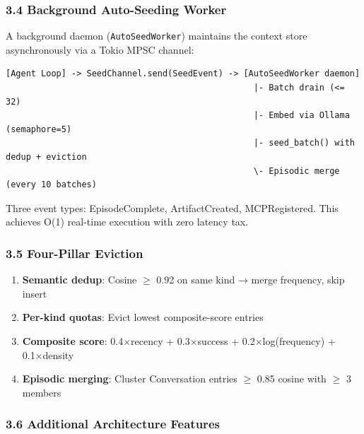 \documentclass[
  10pt,
]{article}
\providecommand{\tightlist}{%
  \setlength{\itemsep}{0pt}\setlength{\parskip}{0pt}}
\begin{document}
\subsubsection{3.4 Background Auto-Seeding
Worker}\label{background-auto-seeding-worker}

A background daemon (\texttt{AutoSeedWorker}) maintains the context
store asynchronously via a Tokio MPSC channel:

\begin{verbatim}
[Agent Loop] -> SeedChannel.send(SeedEvent) -> [AutoSeedWorker daemon]
                                                 |- Batch drain (<= 32)
                                                 |- Embed via Ollama (semaphore=5)
                                                 |- seed_batch() with dedup + eviction
                                                 \- Episodic merge (every 10 batches)
\end{verbatim}

Three event types: EpisodeComplete, ArtifactCreated, MCPRegistered. This
achieves O(1) real-time execution with zero latency tax.

\subsubsection{3.5 Four-Pillar Eviction}\label{four-pillar-eviction}

\begin{enumerate}
\def\labelenumi{\arabic{enumi}.}
\tightlist
\item
  \textbf{Semantic dedup}: Cosine \(\geq\) 0.92 on same kind → merge
  frequency, skip insert
\item
  \textbf{Per-kind quotas}: Evict lowest composite-score entries
\item
  \textbf{Composite score}: 0.4×recency + 0.3×success +
  0.2×log(frequency) + 0.1×density
\item
  \textbf{Episodic merging}: Cluster Conversation entries \(\geq\) 0.85
  cosine with \(\geq\) 3 members
\end{enumerate}

\subsubsection{3.6 Additional Architecture
Features}\label{additional-architecture-features}
\end{document}
